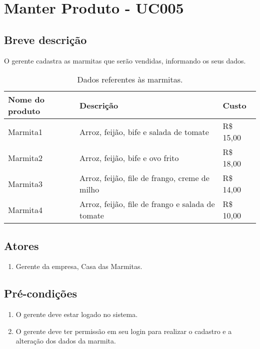 \chapter{Manter Produto - UC005} \label{uc005}

\section{Breve descrição}

O gerente cadastra as marmitas que serão vendidas, informando os seus dados.

\begin{table}[htb]
	\ABNTEXfontereduzida
	\caption[Dados referentes às marmitas]{Dados referentes às marmitas.}
	\centering
	\label{tab-marmitas}
	\begin{tabular}{|p{4cm}|p{8cm}|p{2cm}|}
		\hline
		\textbf{Nome do produto} & \textbf{Descrição}                               & \textbf{Custo} \\ \hline
		Marmita1                 & Arroz, feijão, bife e salada de tomate           & R\$ 15,00      \\ \hline
		Marmita2                 & Arroz, feijão, bife e ovo frito                  & R\$ 18,00      \\ \hline
		Marmita3                 & Arroz, feijão, file de frango, creme de milho    & R\$ 14,00      \\ \hline
		Marmita4                 & Arroz, feijão, file de frango e salada de tomate & R\$ 10,00      \\ \hline
	\end{tabular}
\end{table}

\section{Atores}

\begin{enumerate}
	\item Gerente da empresa, Casa das Marmitas.
\end{enumerate}

\section{Pré-condições}

\begin{enumerate}
	\item O gerente deve estar logado no sistema.
	\item O gerente deve ter permissão em seu login para realizar o cadastro e a alteração dos dados da marmita.
\end{enumerate}

